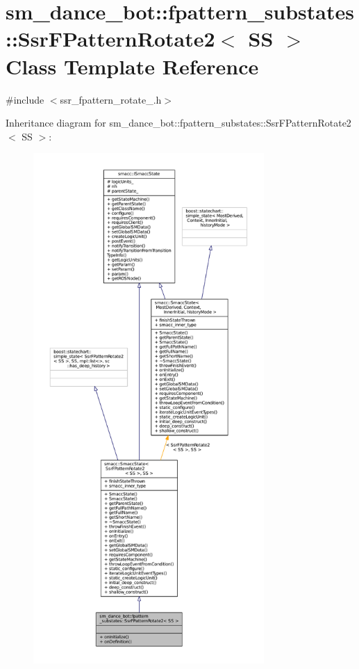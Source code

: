 \hypertarget{structsm__dance__bot_1_1fpattern__substates_1_1SsrFPatternRotate2}{}\section{sm\+\_\+dance\+\_\+bot\+:\+:fpattern\+\_\+substates\+:\+:Ssr\+F\+Pattern\+Rotate2$<$ SS $>$ Class Template Reference}
\label{structsm__dance__bot_1_1fpattern__substates_1_1SsrFPatternRotate2}


{\ttfamily \#include $<$ssr\+\_\+fpattern\+\_\+rotate\+\_.\+h$>$}



Inheritance diagram for sm\+\_\+dance\+\_\+bot\+:\+:fpattern\+\_\+substates\+:\+:Ssr\+F\+Pattern\+Rotate2$<$ SS $>$\+:
\nopagebreak
\begin{figure}[H]
\begin{center}
\leavevmode
\includegraphics[height=550pt]{structsm__dance__bot_1_1fpattern__substates_1_1SsrFPatternRotate2__inherit__graph}
\end{center}
\end{figure}


